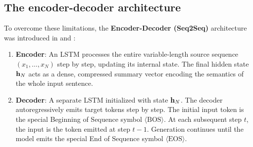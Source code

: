 \documentclass[../../main.tex]{subfiles}
\begin{document}
\subsection{The encoder-decoder architecture}
To overcome these limitations, the \textbf{Encoder-Decoder (Seq2Seq)} architecture was introduced in \cite{sutskever2014} and \cite{cho2014}:
\begin{enumerate}
    \item \textbf{Encoder}: An LSTM processes the entire variable-length source sequence $(x_1, \dots, x_N)$ step by step, updating its internal state. The final hidden state $\mathbf{h}_N$ acts as a dense, compressed summary vector encoding the semantics of the whole input sentence.
    \item \textbf{Decoder}: A separate LSTM initialized with state $\mathbf{h}_N$. The decoder autoregressively emits target tokens step by step. The initial input token is the special Beginning of Sequence symbol $\langle\text{BOS}\rangle$. At each subsequent step $t$, the input is the token emitted at step $t-1$. Generation continues until the model emits the special End of Sequence symbol $\langle\text{EOS}\rangle$.
\end{enumerate}
\end{document}
